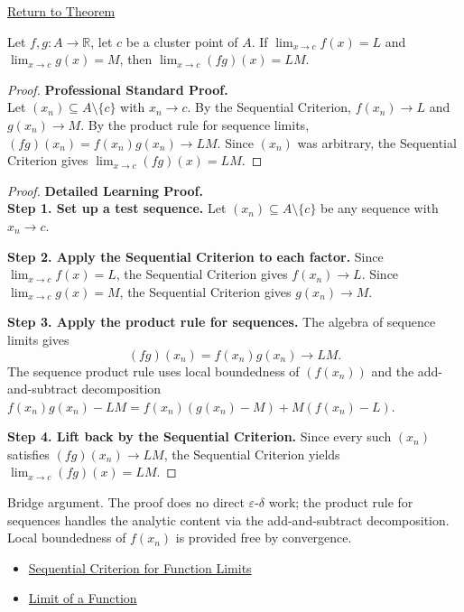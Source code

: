 \newpage
{}
\label{prf:limit-product}

\begin{remark*}[Return]
\hyperref[thm:limit-product]{Return to Theorem}
\end{remark*}

\begin{theorem*}
Let $f, g : A \to \mathbb{R}$, let $c$ be a cluster point of $A$. If
$\lim_{x\to c}f(x)=L$ and $\lim_{x\to c}g(x)=M$, then
$\lim_{x\to c}(fg)(x) = LM$.
\end{theorem*}

\begin{proof}
\textbf{Professional Standard Proof.}~\\
Let $(x_n) \subseteq A \setminus \{c\}$ with $x_n \to c$.
By the Sequential Criterion, $f(x_n) \to L$ and $g(x_n) \to M$.
By the product rule for sequence limits, $(fg)(x_n) = f(x_n)g(x_n) \to LM$.
Since $(x_n)$ was arbitrary, the Sequential Criterion gives
$\lim_{x\to c}(fg)(x) = LM$.
\end{proof}

\begin{proof}
\textbf{Detailed Learning Proof.}~\\
\textbf{Step 1. Set up a test sequence.}
Let $(x_n) \subseteq A \setminus \{c\}$ be any sequence with $x_n \to c$.

\textbf{Step 2. Apply the Sequential Criterion to each factor.}
Since $\lim_{x\to c}f(x)=L$, the Sequential Criterion gives $f(x_n) \to L$.
Since $\lim_{x\to c}g(x)=M$, the Sequential Criterion gives $g(x_n) \to M$.

\textbf{Step 3. Apply the product rule for sequences.}
The algebra of sequence limits gives
\[
  (fg)(x_n) = f(x_n)g(x_n) \to LM.
\]
The sequence product rule uses local boundedness of $(f(x_n))$ and the
add-and-subtract decomposition
$f(x_n)g(x_n) - LM = f(x_n)(g(x_n)-M) + M(f(x_n)-L)$.

\textbf{Step 4. Lift back by the Sequential Criterion.}
Since every such $(x_n)$ satisfies $(fg)(x_n) \to LM$, the Sequential
Criterion yields $\lim_{x\to c}(fg)(x) = LM$.
\end{proof}

\begin{remark*}
Bridge argument. The proof does no direct $\varepsilon$-$\delta$ work; the
product rule for sequences handles the analytic content via the
add-and-subtract decomposition. Local boundedness of $f(x_n)$ is provided
free by convergence.
\end{remark*}

\begin{remark*}[Dependencies]
\begin{itemize}
  \item \hyperref[prop:sequential-criterion-limits]{Sequential Criterion for Function Limits}
  \item \hyperref[def:limit-function]{Limit of a Function}
\end{itemize}
\end{remark*}
